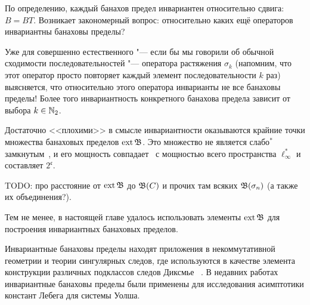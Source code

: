 По определению, каждый банахов предел инвариантен относительно сдвига: $B=BT$.
Возникает закономерный вопрос: относительно каких ещё операторов инвариантны банаховы пределы?

Уже для совершенно естественного "--- если бы мы говорили об обычной сходимости последовательностей "---
оператора растяжения $\sigma_k$
(напомним, что этот оператор просто повторяет каждый элемент последовательности $k$ раз)
выясняется, что относительно этого оператора инварианты не все банаховы пределы!
Более того инвариантность конкретного банахова предела зависит от выбора $k\in\mathbb{N}_2$.




Достаточно <<плохими>> в смысле инвариантности оказываются крайние точки множества банаховых пределов $\operatorname{ext} \mathfrak{B}$.
Это множество не является слабо$^*$ замкнутым~\cite{Nillsen,Talagrand},
и его мощность совпадает~\cite{Chou} с мощностью всего пространства $\ell_\infty^*$
и составляет $2^{\mathfrak c}$.

TODO: про расстояние от $\operatorname{ext} \mathfrak{B}$ до $\mathfrak{B}(C)$ и прочих там всяких $\mathfrak{B}(\sigma_n)$ (а также их объединения?).

Тем не менее, в настоящей главе удалось использовать элементы $\operatorname{ext}\mathfrak{B}$ для построения инвариантных банаховых пределов.


Инвариантные банаховы пределы находят приложения в некоммутативной геометрии
и теории сингулярных следов, где используются в качестве элемента конструкции
различных подклассов следов Диксмье
~\cite{carey2003spectral,lord2012singular,sukochev2015characterization,sukochev2016dixmier}.
В недавних работах~\cite{astashkin2015constants_rus_DAN,astashkin2016constants_rus_SMJ} инвариантные банаховы пределы были применены для исследования
асимптотики констант Лебега для системы Уолша.

